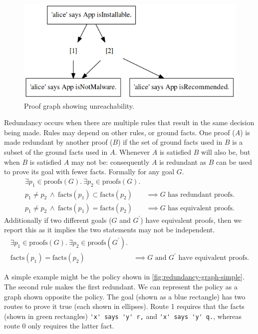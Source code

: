 \documentclass[thesis.tex]{subfiles}
\begin{document}
\begin{figure}
  \centering
  \includegraphics[width=0.5\linewidth]{./figures/unreachability.png}
  \caption{Proof graph showing unreachability.}
  \label{fig:unreachability}
\end{figure}

Redundancy occurs when there are multiple rules that result in the same decision being
made.  Rules may depend on other rules, or ground facts.  One proof ($A$) is made
redundant by another proof ($B$) if the set of ground facts used in $B$ is a
subset of the ground facts used in $A$. Whenever $A$ is satisfied $B$ will also
be, but when $B$ is satisfied $A$ may not be: consequently $A$ is redundant as
$B$ can be used to prove its goal with fewer facts.
Formally for any goal $G$.
\begin{align*}
  \exists p_1 \in \text{proofs}(G).~\exists p_2 \in \text{proofs}(G).        & \\
  p_1 \not= p_2~\wedge~\text{facts}(p_1) \subset \text{facts}(p_2)           & \implies G\text{ has redundant proofs.} \\
  p_1 \not= p_2~\wedge~\text{facts}(p_1) = \text{facts}(p_2)                 & \implies G\text{ has equivalent proofs.}
\end{align*}
Additionally if two different goals ($G$ and $G^\prime$) have equivalent proofs, then we report this
as it implies the two statements may not be independent.
\begin{align*}
  \exists p_1 \in \text{proofs}(G).~\exists p_2 \in \text{proofs}(G^\prime). & \\
  \text{facts}(p_1) = \text{facts}(p_2)                                      & \implies \text{$G$ and $G^\prime$ have equivalent proofs.}
\end{align*}

A simple example might be the policy shown in \autoref{fig:redundancy-graph-simple}.
The second rule makes the first redundant.  We can represent the policy
as a graph shown opposite the policy.  The goal (shown as a blue rectangle) has two routes
to prove it true (each shown in ellipses).  Route 1 requires that the facts
(shown in green rectangles) \lstinline!'x' says 'y' r,! and
\lstinline!'x' says 'y' q.!, whereas route 0 only requires the
latter fact.
\end{document}
